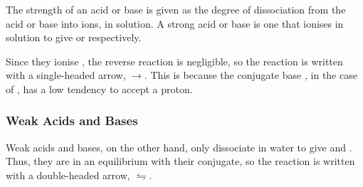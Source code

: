 				The strength of an acid or base is given as the degree of dissociation from the acid or base into ions, in solution. A strong
				acid or base is one that ionises  in solution to give  or  respectively.


				Since they ionise , the reverse reaction is negligible, so the reaction is written with a single-headed
				arrow, $\longrightarrow$. This is because the conjugate base \ch{\Cl-}, in the case of , has a low tendency to
				accept a proton.



			\pagebreak
			\subsubsection{Weak Acids and Bases}

				Weak acids and bases, on the other hand, only dissociate  in water to give  and . Thus, they
				are in an equilibrium with their conjugate, so the reaction is written with a double-headed arrow, $\leftrightharpoons$.


